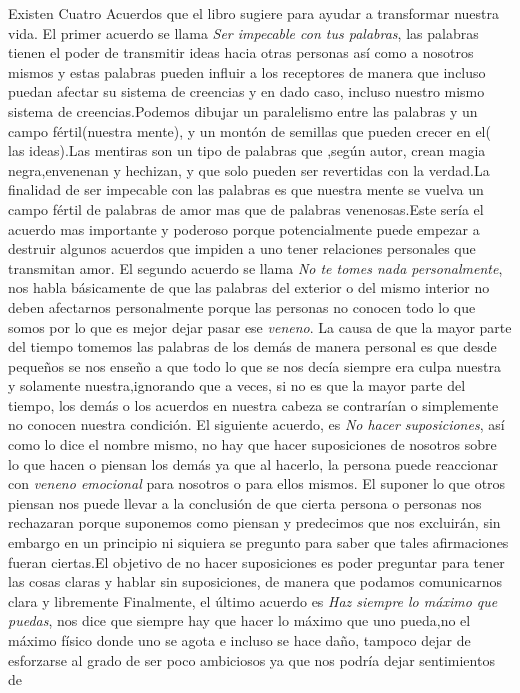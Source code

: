 \documentclass[a4paper,12pt]{article}
\begin{document}
Existen Cuatro Acuerdos que el libro sugiere para ayudar a
transformar nuestra vida.
El primer acuerdo se llama  \textit{Ser impecable con tus palabras}, las palabras tienen el poder
de transmitir ideas hacia otras personas así como a nosotros mismos y estas palabras
pueden influir a los receptores de manera que incluso puedan afectar su sistema de creencias y en
dado caso, incluso nuestro mismo sistema de creencias.Podemos dibujar un paralelismo entre las
palabras y un campo fértil(nuestra mente), y un montón de semillas que pueden crecer en el(
las ideas).Las mentiras son un tipo de palabras que
,según autor, crean magia negra,envenenan y hechizan, y que solo pueden ser revertidas
con la verdad.La finalidad de ser impecable con las palabras es que nuestra mente se vuelva un
campo fértil de palabras de amor mas que de palabras venenosas.Este sería el acuerdo mas
importante y poderoso porque potencialmente puede empezar a destruir algunos acuerdos que impiden
a uno tener relaciones personales que transmitan amor.
El segundo acuerdo se llama \textit{No te tomes nada personalmente}, nos habla básicamente de que
las palabras del exterior o del mismo interior no deben afectarnos personalmente porque las
personas no conocen todo lo que somos por lo que es mejor dejar pasar ese \textit{veneno}. La causa de
que la mayor parte del tiempo tomemos las palabras de los demás de manera personal es que desde
pequeños se nos enseño a que todo lo que se nos decía siempre era culpa nuestra y solamente
nuestra,ignorando  que a veces, si no es que la mayor parte del tiempo, los demás o los acuerdos en nuestra cabeza se contrarían o
simplemente no conocen nuestra condición.
El siguiente acuerdo, es \textit{No hacer suposiciones}, así como lo dice el nombre mismo, no hay
que hacer suposiciones de nosotros sobre lo que hacen o piensan los demás ya que al hacerlo, la
persona puede reaccionar con \textit{veneno emocional} para nosotros o para ellos mismos. El suponer lo
que otros piensan nos puede llevar a la conclusión de que cierta persona o personas nos rechazaran
porque suponemos como piensan y predecimos que nos excluirán, sin embargo en un principio ni siquiera se pregunto para saber que tales afirmaciones
fueran ciertas.El objetivo de no hacer suposiciones es poder preguntar para tener las cosas
claras y hablar sin suposiciones, de manera que podamos comunicarnos clara y libremente
Finalmente, el último acuerdo es \textit{Haz siempre lo máximo que puedas}, nos dice que siempre
hay que hacer lo máximo que uno pueda,no el máximo físico donde uno se agota e incluso se
hace daño, tampoco dejar de esforzarse al grado de ser poco ambiciosos ya que nos podría dejar sentimientos de
\end{document}
